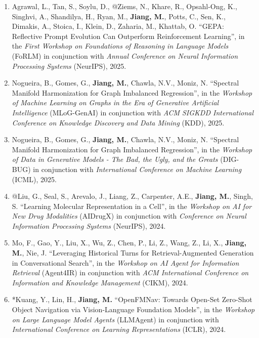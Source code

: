 \documentclass[10pt]{article}
\newenvironment{myindentpar}[1]%
{\begin{list}{}%
         {\setlength{\leftmargin}{#1}}%
         \item[]%
}
{\end{list}}
\newcounter{list}
\begin{document}
\begin{myindentpar}{0.00cm}
\begin{enumerate}[leftmargin=.5cm]
\item[W38] Agrawal, L., Tan, S., Soylu, D., @Ziems, N., Khare, R., Opsahl-Ong, K., Singhvi, A., Shandilya, H., Ryan, M., \textbf{Jiang, M.}, Potts, C., Sen, K., Dimakis, A., Stoica, I., Klein, D., Zaharia, M., Khattab, O. ``GEPA: Reflective Prompt Evolution Can Outperform Reinforcement Learning'', in the \textit{First Workshop on Foundations of Reasoning in Language Models} (FoRLM) in conjunction with \textit{Annual Conference on Neural Information Processing Systems} (NeurIPS), 2025.

\item[W37] Nogueira, B., Gomes, G., \textbf{Jiang, M.}, Chawla, N.V., Moniz, N. ``Spectral Manifold Harmonization for Graph Imbalanced Regression'', in the \textit{Workshop of Machine Learning on Graphs in the Era of Generative Artificial Intelligence} (MLoG-GenAI) in conjunction with \textit{ACM SIGKDD International Conference on Knowledge Discovery and Data Mining} (KDD), 2025.

\item[W36] Nogueira, B., Gomes, G., \textbf{Jiang, M.}, Chawla, N.V., Moniz, N. ``Spectral Manifold Harmonization for Graph Imbalanced Regression'', in the \textit{Workshop of Data in Generative Models - The Bad, the Ugly, and the Greats} (DIG-BUG) in conjunction with \textit{International Conference on Machine Learning} (ICML), 2025.

\item[W35] @Liu, G., Seal, S., Arevalo, J., Liang, Z., Carpenter, A.E., \textbf{Jiang, M.}, Singh, S. ``Learning Molecular Representation in a Cell'', in the \textit{Workshop on AI for New Drug Modalities} (AIDrugX) in conjunction with \textit{Conference on Neural Information Processing Systems} (NeurIPS), 2024.
		
\item[W34] Mo, F., Gao, Y., Liu, X., Wu, Z., Chen, P., Li, Z., Wang, Z., Li, X., \textbf{Jiang, M.}, Nie, J. ``Leveraging Historical Turns for Retrieval-Augmented Generation in Conversational Search'', in the \textit{Workshop on AI Agent for Information Retrieval} (Agent4IR) in conjunction with \textit{ACM International Conference on Information and Knowledge Management} (CIKM), 2024.
		
\item[W33] *Kuang, Y., Lin, H., \textbf{Jiang, M.} ``OpenFMNav: Towards Open-Set Zero-Shot Object Navigation via Vision-Language Foundation Models'', in the \textit{Workshop on Large Language Model Agents} (LLMAgent) in conjunction with \textit{International Conference on Learning Representations} (ICLR), 2024.


\end{enumerate}
\end{myindentpar}
\end{document}
